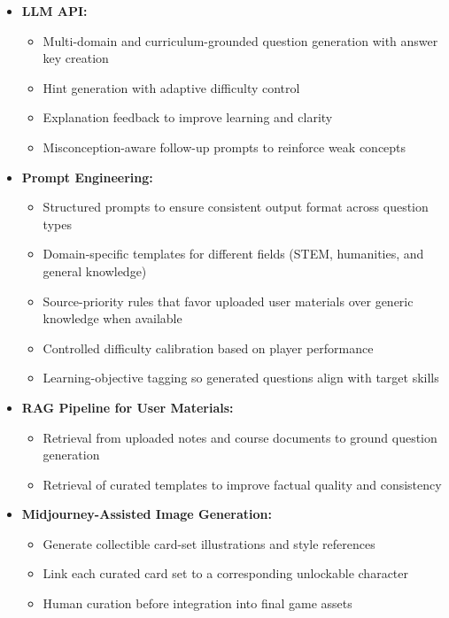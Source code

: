 \documentclass[12pt]{article}
\begin{document}
\begin{itemize}
    \item \textbf{LLM API:}
    \begin{itemize}
        \item Multi-domain and curriculum-grounded question generation with answer key creation
        \item Hint generation with adaptive difficulty control
        \item Explanation feedback to improve learning and clarity
        \item Misconception-aware follow-up prompts to reinforce weak concepts
    \end{itemize}
    
    \item \textbf{Prompt Engineering:}
    \begin{itemize}
        \item Structured prompts to ensure consistent output format across question types
        \item Domain-specific templates for different fields (STEM, humanities, and general knowledge)
        \item Source-priority rules that favor uploaded user materials over generic knowledge when available
        \item Controlled difficulty calibration based on player performance
        \item Learning-objective tagging so generated questions align with target skills
    \end{itemize}
    
    \item \textbf{RAG Pipeline for User Materials:}
    \begin{itemize}
        \item Retrieval from uploaded notes and course documents to ground question generation
        \item Retrieval of curated templates to improve factual quality and consistency
    \end{itemize}
    
    \item \textbf{Midjourney-Assisted Image Generation:}
    \begin{itemize}
        \item Generate collectible card-set illustrations and style references
        \item Link each curated card set to a corresponding unlockable character
        \item Human curation before integration into final game assets
    \end{itemize}
\end{itemize}
\end{document}
